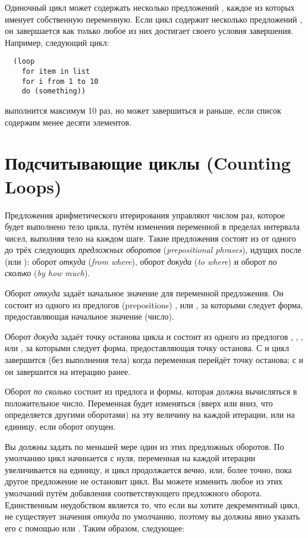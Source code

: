 Одиночный цикл может содержать несколько предложений , каждое из которых именует
собственную переменную. Если цикл содержит несколько предложений , он
завершается как только любое из них достигает своего условия завершения. Например,
следующий цикл:

\begin{lstlisting}
  (loop
    for item in list
    for i from 1 to 10
    do (something))
\end{lstlisting}

выполнится максимум 10 раз, но может завершиться и раньше, если список содержим менее
десяти элементов.

\section{Подсчитывающие циклы (Counting Loops)}

Предложения арифметического итерирования управляют числом раз, которое будет выполнено
тело цикла, путём изменения переменной в пределах интервала чисел, выполняя тело на каждом
шаге. Такие предложения состоят из от одного до трёх следующих \textit{предложных
  оборотов} (\textit{prepositional phrases}), идущих после  (или ):
оборот \textit{откуда} (\textit{from where}), оборот \textit{докуда} (\textit{to where}) и
оборот \textit{по сколько} (\textit{by how much}).

Оборот \textit{откуда} задаёт начальное значение для переменной предложения. Он состоит из
одного из предлогов (prepositions) ,  или , за
которыми следует форма, предоставляющая начальное значение (число).

Оборот \textit{докуда} задаёт точку останова цикла и состоит из одного из предлогов
, , ,  или , за которыми следует
форма, предоставляющая точку останова. С  и  цикл завершится (без
выполнения тела) когда переменная перейдёт точку останова; с  и 
он завершится на итерацию ранее.

Оборот \textit{по сколько} состоит из предлога  и формы, которая должна
вычисляться в положительное число. Переменная будет изменяться (вверх или вниз, что
определяется другими оборотами) на эту величину на каждой итерации, или на единицу, если
оборот опущен.

Вы должны задать по меньшей мере один из этих предложных оборотов. По умолчанию цикл
начинается с нуля, переменная на каждой итерации увеличивается на единицу, и цикл
продолжается вечно, или, более точно, пока другое предложение не остановит цикл. Вы можете
изменить любое из этих умолчаний путём добавления соответствующего предложного
оборота. Единственным неудобством является то, что если вы хотите декрементный цикл, не
существует значения \textit{откуда} по умолчанию, поэтому вы должны явно указать его с
помощью  или . Таким образом, следующее:

